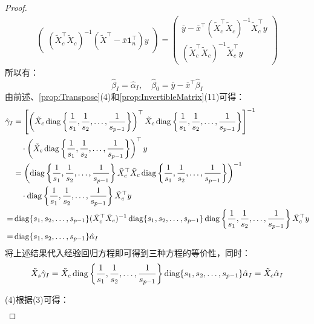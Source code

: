 \begin{proof}
\begin{align*}
\begin{pmatrix}
		(\tilde{X}_c^{\top}\tilde{X}_c)^{-1}(\tilde{X}^{\top}-\overline{x}\mathbf{1}_n^{\top})y
		\end{pmatrix}=
		\begin{pmatrix}
		\overline{y}-\overline{x}^{\top}(\tilde{X}_c^{\top}\tilde{X}_c)^{-1}\tilde{X}_c^{\top}y \\
		(\tilde{X}_c^{\top}\tilde{X}_c)^{-1}\tilde{X}_c^{\top}y
		\end{pmatrix}
	\end{align*}
	所以有：
	\begin{equation*}
		\hat{\beta}_I=\hat{\alpha}_I,\quad\hat{\beta}_0=\overline{y}-\overline{x}^{\top}\hat{\beta}_I
	\end{equation*}
	由前述、\cref{prop:Transpose}(4)和\cref{prop:InvertibleMatrix}(11)可得：
	\begin{align*}
		\hat{\gamma}_I&=\left[\left(\tilde{X}_c\operatorname{diag}\left\{\dfrac{1}{s_1},\dfrac{1}{s_2},\dots,\dfrac{1}{s_{p-1}}\right\}\right)^{\top}\tilde{X}_c\operatorname{diag}\left\{\dfrac{1}{s_1},\dfrac{1}{s_2},\dots,\dfrac{1}{s_{p-1}}\right\}\right]^{-1} \\
		&\quad\cdot\left(\tilde{X}_c\operatorname{diag}\left\{\dfrac{1}{s_1},\dfrac{1}{s_2},\dots,\dfrac{1}{s_{p-1}}\right\}\right)^{\top}y \\
		&=\left(\operatorname{diag}\left\{\dfrac{1}{s_1},\dfrac{1}{s_2},\dots,\dfrac{1}{s_{p-1}}\right\}\tilde{X}_c^{\top}\tilde{X}_c\operatorname{diag}\left\{\dfrac{1}{s_1},\dfrac{1}{s_2},\dots,\dfrac{1}{s_{p-1}}\right\}\right)^{-1} \\
		&\quad\cdot\operatorname{diag}\left\{\dfrac{1}{s_1},\dfrac{1}{s_2},\dots,\dfrac{1}{s_{p-1}}\right\}\tilde{X}_c^{\top}y \\
		=&\operatorname{diag}\{s_1, s_2, \dots, s_{p-1}\}(\tilde{X}_c^{\top}\tilde{X}_c)^{-1}\operatorname{diag}\{s_1, s_2, \dots, s_{p-1}\}\operatorname{diag}\left\{\dfrac{1}{s_1},\dfrac{1}{s_2},\dots,\dfrac{1}{s_{p-1}}\right\}\tilde{X}_c^{\top}y  \\
		=&\operatorname{diag}\{s_1, s_2, \dots, s_{p-1}\}\hat{\alpha}_I
	\end{align*}
	将上述结果代入经验回归方程即可得到三种方程的等价性，同时：
	\begin{equation*}
		\tilde{X}_s\hat{\gamma}_I=\tilde{X}_c\operatorname{diag}\left\{\dfrac{1}{s_1},\dfrac{1}{s_2},\dots,\dfrac{1}{s_{p-1}}\right\}\operatorname{diag}\{s_1, s_2, \dots, s_{p-1}\}\hat{\alpha}_I=\tilde{X}_c\hat{\alpha}_I
	\end{equation*}\par
	(4)根据(3)可得：
	\begin{gather*}

\end{gather*}
\end{proof}
